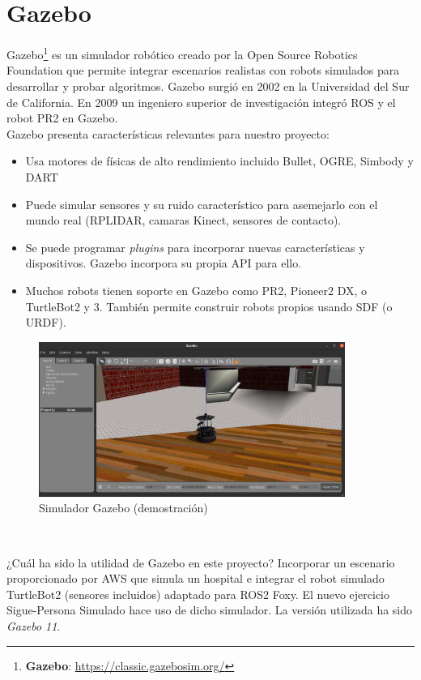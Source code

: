 \section{Gazebo}
\label{sec:gazebo}

Gazebo\footnote{\textbf{Gazebo}: \url{https://classic.gazebosim.org/}} es un simulador robótico creado por la Open Source Robotics Foundation que permite integrar escenarios realistas con robots simulados para desarrollar y probar algoritmos. Gazebo surgió en 2002 en la Universidad del Sur de California. En 2009 un ingeniero superior de investigación integró ROS y el robot PR2 en Gazebo.\\

Gazebo presenta características relevantes para nuestro proyecto:
\begin{itemize}
	\item Usa motores de físicas de alto rendimiento incluido Bullet, OGRE, Simbody y DART
	\item Puede simular sensores y su ruido característico para asemejarlo con el mundo real (RPLIDAR, camaras Kinect, sensores de contacto).
	\item Se puede programar \textit{plugins} para incorporar nuevas características y dispositivos. Gazebo incorpora su propia API para ello.
	\item Muchos robots tienen soporte en Gazebo como PR2, Pioneer2 DX,  o TurtleBot2 y 3. También permite construir robots propios usando SDF (o URDF).
\end{itemize}

\begin{figure} [H]
  \begin{center}
    \includegraphics[width=10cm]{imagenes/cap3/simulacion-gazebo.png}
  \end{center}
  \caption{Simulador Gazebo (demostración)}
  \label{fig:simulador_gazebo}
\end{figure}\

¿Cuál ha sido la utilidad de Gazebo en este proyecto? Incorporar un escenario proporcionado por AWS que simula un hospital e integrar el robot simulado TurtleBot2 (sensores incluidos) adaptado para ROS2 Foxy. El nuevo ejercicio Sigue-Persona Simulado hace uso de dicho simulador. La versión utilizada ha sido \textit{Gazebo 11}.\\




